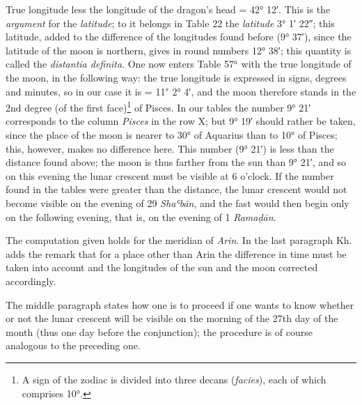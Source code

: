 \documentclass[11pt]{article}
\newcommand{\Pg}[1]{\marginpar{\footnotesize\color{gray}#1}}
\begin{document}
\par \Pg{68}True longitude less the longitude of the dragon's head = 42° 12′. This is the \emph{argument} for the \emph{latitude}; to it belongs in Table 22 the \emph{latitude} 3° 1′ 22″; this latitude, added to the difference of the longitudes found before (9° 37′), since the latitude of the moon is northern, gives in round numbers 12° 38′; this quantity is called the \emph{distantia definita}. One now enters Table 57$^{a}$ with the true longitude of the moon, in the following way: the true longitude is expressed in signs, degrees and minutes, so in our case it is = 11$^{s}$ 2° 4′, and the moon therefore stands in the 2nd degree (of the first face)\footnote{A sign of the zodiac is divided into three decans (\emph{facies}), each of which comprises 10°.} of Pisces. In our tables the number 9° 21′ corresponds to the column \emph{Pisces} in the row X; but 9° 19′ should rather be taken, since the place of the moon is nearer to 30° of Aquarius than to 10° of Pisces; this, however, makes no difference here. This number (9° 21′) is less than the distance found above; the moon is thus farther from the sun than 9° 21′, and so on this evening the lunar crescent must be visible at 6 o'clock. If the number found in the tables were greater than the distance, the lunar crescent would not become visible on the evening of 29 \emph{Shaʿbān}, and the fast would then begin only on the following evening, that is, on the evening of 1 \emph{Ramaḍān}.\par
\par The computation given holds for the meridian of \emph{Arin}. In the last paragraph Kh. adds the remark that for a place other than Arin the difference in time must be taken into account and the longitudes of the sun and the moon corrected accordingly.\par
\par The middle paragraph states how one is to proceed if one wants to know whether or not the lunar crescent will be visible on the morning of the 27th day of the month (thus one day before the conjunction); the procedure is of course analogous to the preceding one.\par
\end{document}
